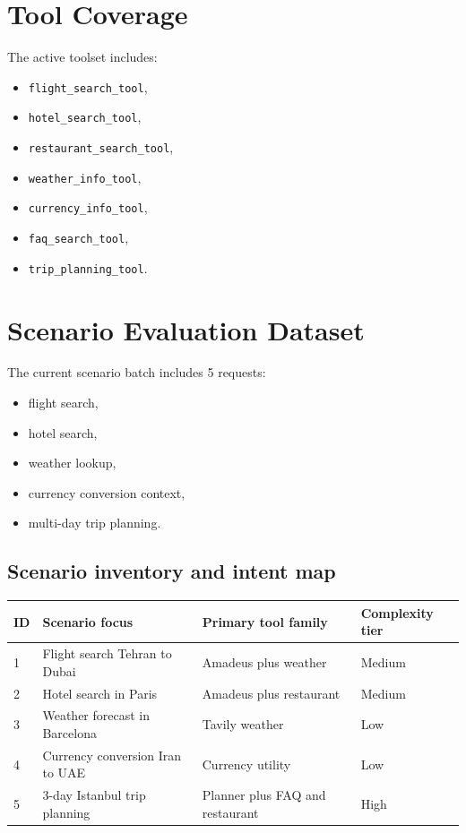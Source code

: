 \documentclass[12pt,a4paper]{article}
\begin{document}
\section{Tool Coverage}
The active toolset includes:
\begin{itemize}
\item \texttt{flight\_search\_tool},
\item \texttt{hotel\_search\_tool},
\item \texttt{restaurant\_search\_tool},
\item \texttt{weather\_info\_tool},
\item \texttt{currency\_info\_tool},
\item \texttt{faq\_search\_tool},
\item \texttt{trip\_planning\_tool}.
\end{itemize}

\section{Scenario Evaluation Dataset}
The current scenario batch includes 5 requests:
\begin{itemize}
\item flight search,
\item hotel search,
\item weather lookup,
\item currency conversion context,
\item multi-day trip planning.
\end{itemize}

\subsection*{Scenario inventory and intent map}
\begin{longtable}{@{}p{} p{} p{} p{}@{}}
\toprule
ID & Scenario focus & Primary tool family & Complexity tier \\
\midrule
1 & Flight search Tehran to Dubai & Amadeus plus weather & Medium \\
2 & Hotel search in Paris & Amadeus plus restaurant & Medium \\
3 & Weather forecast in Barcelona & Tavily weather & Low \\
4 & Currency conversion Iran to UAE & Currency utility & Low \\
5 & 3-day Istanbul trip planning & Planner plus FAQ and restaurant & High \\
\bottomrule
\end{longtable}
\end{document}
